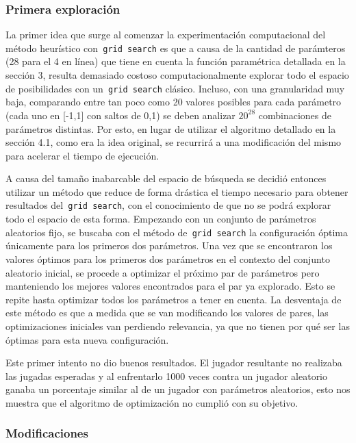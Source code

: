 \documentclass[A4paper,oneside,fleqn,11pt]{article}
\theoremstyle{definition}
\begin{document}
\subsubsection{Primera exploración}

La primer idea que surge al comenzar la experimentación computacional del método heurístico con\texttt{ grid search} es que a causa de la cantidad de parámteros (28 para el 4 en línea) que tiene en cuenta la función paramétrica detallada en la sección 3, resulta demasiado costoso computacionalmente explorar todo el espacio de posibilidades con un\texttt{ grid search} clásico. Incluso, con una granularidad muy baja, comparando entre tan poco como 20 valores posibles para cada parámetro (cada uno en [-1,1] con saltos de 0,1) se deben analizar $ 20^{28}$ combinaciones de parámetros distintas. Por esto, en lugar de utilizar el algoritmo detallado en la sección 4.1, como era la idea original, se recurrirá a una modificación del mismo para acelerar el tiempo de ejecución.

A causa del tamaño inabarcable del espacio de búsqueda se decidió entonces utilizar un método que reduce de forma drástica el tiempo necesario para obtener resultados del\texttt{ grid search}, con el conocimiento de que no se podrá explorar todo el espacio de esta forma. Empezando con un conjunto de parámetros aleatorios fijo, se buscaba con el método de\texttt{ grid search} la configuración óptima únicamente para los primeros dos parámetros. Una vez que se encontraron los valores óptimos para los primeros dos parámetros en el contexto del conjunto aleatorio inicial, se procede a optimizar el próximo par de parámetros pero manteniendo los mejores valores encontrados para el par ya explorado. Esto se repite hasta optimizar todos los parámetros a tener en cuenta. La desventaja de este método es que a medida que se van modificando los valores de pares, las optimizaciones iniciales van perdiendo relevancia, ya que no tienen por qué ser las óptimas para esta nueva configuración.

Este primer intento no dio buenos resultados. El jugador resultante no realizaba las jugadas esperadas y al enfrentarlo 1000 veces contra un jugador aleatorio ganaba un porcentaje similar al de un jugador con parámetros aleatorios, esto nos muestra que el algoritmo de optimización no cumplió con su objetivo.


\subsubsection{Modificaciones}
\end{document}
